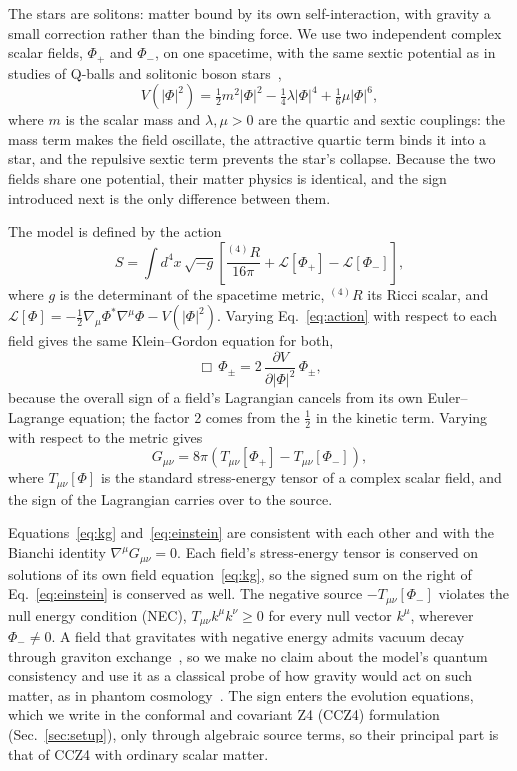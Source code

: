 \documentclass[twocolumn,floatfix,aps,prd,superscriptaddress,nofootinbib]{revtex4-2}
\begin{document}
The stars are solitons: matter bound by its own self-interaction, with gravity a small correction rather than the binding force. We use two independent complex scalar fields, $\Phi_+$ and $\Phi_-$, on one spacetime, with the same sextic potential as in studies of Q-balls and solitonic boson stars~\cite{friedberg1976,coleman1985,friedberg1987},
\begin{equation}
V(|\Phi|^2)=\tfrac12 m^2|\Phi|^2-\tfrac14\lambda|\Phi|^4+\tfrac16\mu|\Phi|^6 ,
\label{eq:potential}
\end{equation}
where $m$ is the scalar mass and $\lambda,\mu>0$ are the quartic and sextic couplings: the mass term makes the field oscillate, the attractive quartic term binds it into a star, and the repulsive sextic term prevents the star's collapse. Because the two fields share one potential, their matter physics is identical, and the sign introduced next is the only difference between them.

The model is defined by the action
\begin{equation}
S=\int d^4x\,\sqrt{-g}\left[\frac{{}^{(4)}\!R}{16\pi}+\mathcal{L}[\Phi_+]-\mathcal{L}[\Phi_-]\right],
\label{eq:action}
\end{equation}
where $g$ is the determinant of the spacetime metric, ${}^{(4)}\!R$ its Ricci scalar, and $\mathcal{L}[\Phi]=-\tfrac12\nabla_\mu\Phi^*\nabla^\mu\Phi-V(|\Phi|^2)$. Varying Eq.~\eqref{eq:action} with respect to each field gives the same Klein--Gordon equation for both,
\begin{equation}
\Box\,\Phi_\pm=2\,\frac{\partial V}{\partial|\Phi|^2}\,\Phi_\pm ,
\label{eq:kg}
\end{equation}
because the overall sign of a field's Lagrangian cancels from its own Euler--Lagrange equation; the factor 2 comes from the $\tfrac12$ in the kinetic term. Varying with respect to the metric gives
\begin{equation}
G_{\mu\nu}=8\pi\left(T_{\mu\nu}[\Phi_+]-T_{\mu\nu}[\Phi_-]\right),
\label{eq:einstein}
\end{equation}
where $T_{\mu\nu}[\Phi]$ is the standard stress-energy tensor of a complex scalar field, and the sign of the Lagrangian carries over to the source.

Equations~\eqref{eq:kg} and~\eqref{eq:einstein} are consistent with each other and with the Bianchi identity $\nabla^\mu G_{\mu\nu}=0$. Each field's stress-energy tensor is conserved on solutions of its own field equation~\eqref{eq:kg}, so the signed sum on the right of Eq.~\eqref{eq:einstein} is conserved as well. The negative source $-T_{\mu\nu}[\Phi_-]$ violates the null energy condition (NEC), $T_{\mu\nu}k^\mu k^\nu\ge0$ for every null vector $k^\mu$, wherever $\Phi_-\neq0$. A field that gravitates with negative energy admits vacuum decay through graviton exchange~\cite{carroll2003,cline2004}, so we make no claim about the model's quantum consistency and use it as a classical probe of how gravity would act on such matter, as in phantom cosmology~\cite{caldwell2002}. The sign enters the evolution equations, which we write in the conformal and covariant Z4 (CCZ4) formulation (Sec.~\ref{sec:setup}), only through algebraic source terms, so their principal part is that of CCZ4 with ordinary scalar matter.
\end{document}
